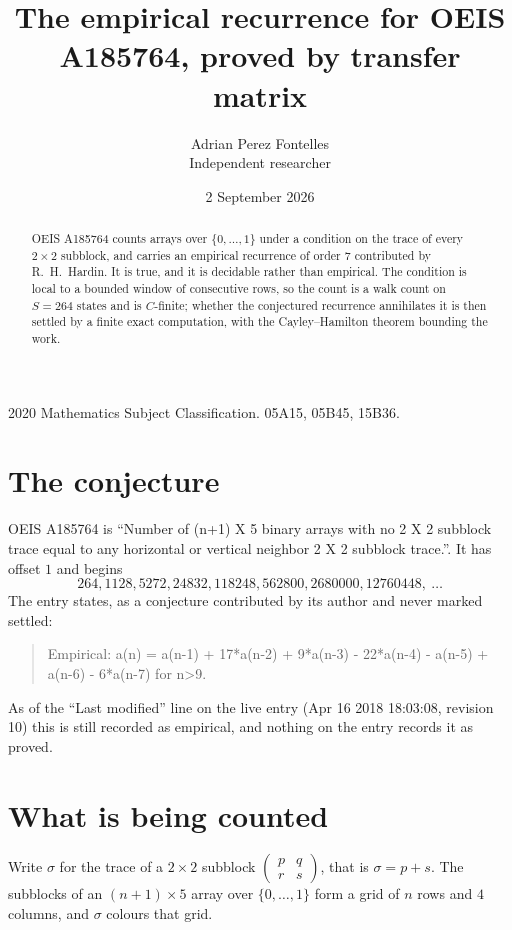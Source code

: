 \documentclass[11pt,a4paper]{article}
\title{The empirical recurrence for OEIS A185764, proved by transfer matrix}
\author{Adrian Perez Fontelles\\ \small Independent researcher}
\date{2 September 2026}
\theoremstyle{plain}
\theoremstyle{definition}
\begin{document}
\maketitle

\begin{abstract}
OEIS A185764 counts arrays over $\{0,\dots,1\}$ under a condition on the trace of every
$2\times2$ subblock, and carries an empirical recurrence of order $7$ contributed by
R.~H.~Hardin. It is true, and it is decidable rather than empirical. The condition is local to
a bounded window of consecutive rows, so the count is a walk count on $S=264$ states and is
$C$-finite; whether the conjectured recurrence annihilates it is then settled by a finite exact
computation, with the Cayley--Hamilton theorem bounding the work.
\end{abstract}

\noindent\small 2020 Mathematics Subject Classification. 05A15, 05B45, 15B36.\normalsize

\section{The conjecture}

OEIS A185764 is ``Number of (n+1) X 5 binary arrays with no 2 X 2 subblock trace equal to any horizontal or vertical neighbor 2 X 2 subblock trace.''. It has offset $1$ and begins
\[
264, 1128, 5272, 24832, 118248, 562800, 2680000, 12760448,\ \dots
\]
The entry states, as a conjecture contributed by its author and never marked settled:
\begin{quote}
Empirical: a(n) = a(n-1) + 17*a(n-2) + 9*a(n-3) - 22*a(n-4) - a(n-5) + a(n-6) - 6*a(n-7) for n>9.
\end{quote}
As of the ``Last modified'' line on the live entry (Apr 16 2018 18:03:08, revision 10) this is still
recorded as empirical, and nothing on the entry records it as proved.

\section{What is being counted}

Write $\sigma$ for the trace of a $2\times2$ subblock
$\begin{pmatrix}p&q\\r&s\end{pmatrix}$, that is $\sigma=p+s$. The subblocks of an
$(n+1)\times5$ array over $\{0,\dots,1\}$ form a grid of $n$ rows and $4$
columns, and $\sigma$ colours that grid.
\end{document}
